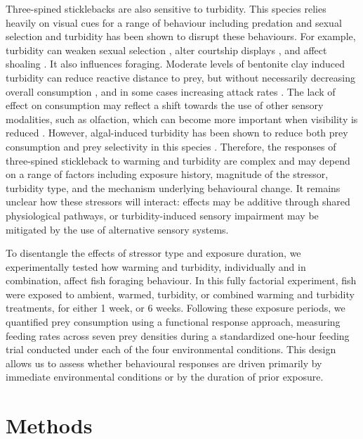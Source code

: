 \documentclass[ASNA,twocolumn]{USG} %
\begin{document}
Three-spined sticklebacks are also sensitive to turbidity. This species relies heavily on visual cues for a range of behaviour including predation and sexual selection \citep{huntingfordThreespinedSticklebacksGasterosteus2009, ibrahimRoleVisualCues1989} and turbidity has been shown to disrupt these behaviours. For example, turbidity can weaken sexual selection \citep{candolinChangedEnvironmentalConditions2007}, alter courtship displays \citep{engstrom-ostHumaninducedWaterTurbidity2007}, and affect shoaling \citep{macgregorShoalingBehaviourResponse2023}. It also influences foraging. Moderate levels of bentonite clay induced turbidity can reduce reactive distance to prey, but without necessarily decreasing overall consumption \citep{quesenberryInfluenceTurbidityThreespined2007}, and in some cases increasing attack rates \citep{vollsetInterplayIndividualInteractions2011}. The lack of effect on consumption may reflect a shift towards the use of other sensory modalities, such as olfaction, which can become more important when visibility is reduced \citep{websterTurbidityForagingRate2007}. However, algal-induced turbidity has been shown to reduce both prey consumption and prey selectivity in this species \cite{sohelEffectsTurbidityPrey2017}. Therefore, the responses of three-spined stickleback to warming and turbidity are complex and may depend on a range of factors including exposure history, magnitude of the stressor, turbidity type, and the mechanism underlying behavioural change. It remains unclear how these stressors will interact: effects may be additive through shared physiological pathways, or turbidity-induced sensory impairment may be mitigated by the use of alternative sensory systems. 

To disentangle the effects of stressor type and exposure duration, we experimentally tested how warming and turbidity, individually and in combination, affect fish foraging behaviour. In this fully factorial experiment, fish were exposed to ambient, warmed, turbidity, or combined warming and turbidity treatments, for either 1 week, or 6 weeks. Following these exposure periods, we quantified prey consumption using a functional response approach, measuring feeding rates across seven prey densities during a standardized one-hour feeding trial conducted under each of the four environmental conditions. This design allows us to assess whether behavioural responses are driven primarily by immediate environmental conditions or by the duration of prior exposure. 

\section{Methods}
\end{document}
